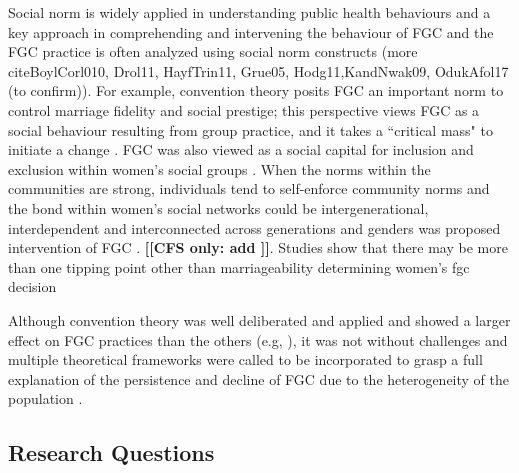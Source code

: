\documentclass[12pt,]{article}
\newcommand{\comment}[1]{\textbf{[[#1]]}}
\newcommand{\cfonly}[1]{\comment{CFS only: #1}}
\begin{document}
Social norm is widely applied in understanding public health behaviours \cite{Ajze91, Ajze02, CislHeis18a,MollRima10, RimaLapi15} and a key approach in comprehending and intervening the behaviour of FGC \cite{Bicc10, BiccMari15, Mack96, Mack00, MackLeJe08, RimaLapi15, Youn11, UNIC10, UNIC13} and the FGC practice is often analyzed using social norm constructs \cite{DuncWand11, EffeVogt15, Hayf05, Youn02, } (more cite{BoylCorl010, Drol11, HayfTrin11, Grue05, Hodg11,KandNwak09, OdukAfol17} (to confirm)).  For example, convention theory posits FGC an important norm to control marriage fidelity and social prestige; this perspective views FGC as a social behaviour resulting from group practice, and it takes a ``critical mass" to initiate a change \cite{Mack00, MackLeJe08}.  FGC was also viewed as a social capital for inclusion and exclusion within women’s social groups \cite{Shel-Wand11}.  When the norms within the communities are strong, individuals tend to self-enforce community norms \cite{Ajze02, Hayf05, KandNwak09, KandShel19, Mack96, Mack06, MackLeJe08, ThomMadd92} and the bond within women's social networks could be intergenerational, interdependent and interconnected across generations and genders was proposed intervention of FGC  \cite{Mack00, DuncWand11, ShelWand11}. \cfonly{add \cite{Bicc15}}.  Studies show that there may be more than one tipping point other than marriageability determining women’s fgc decision \cite{AlcaGonz13, BellNova15, EffeVogt15, Hayf05, Mack09, PashPonn16, Rima08, ShelWand11, more?}


Although convention theory was well deliberated and applied and showed a larger effect on FGC practices than the others (e.g, \cite{BoylMcMo02, BoylCorl10, FreyJohn07, FrieMahm13, Hayf05, KandMwek09, Mack96, Mack06, ReigGonz14, YirgKass12}),  it was not without challenges \cite{EffeVogt15} and multiple theoretical frameworks were called to be incorporated to grasp a full explanation of the persistence and decline of FGC due to the heterogeneity of the population \cite{EffeVogt15, ModrLiu13}.  



\subsection{Research Questions}\label{research-questions}
\end{document}
